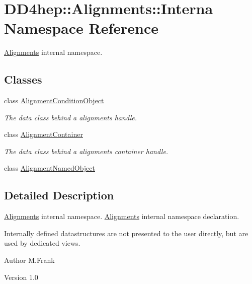 \hypertarget{namespace_d_d4hep_1_1_alignments_1_1_interna}{
\section{DD4hep::Alignments::Interna Namespace Reference}
\label{namespace_d_d4hep_1_1_alignments_1_1_interna}
}


\hyperlink{namespace_d_d4hep_1_1_alignments}{Alignments} internal namespace.  
\subsection*{Classes}
\begin{DoxyCompactItemize}
\item 
class \hyperlink{class_d_d4hep_1_1_alignments_1_1_interna_1_1_alignment_condition_object}{AlignmentConditionObject}
\begin{DoxyCompactList}\small\item\em The data class behind a alignments handle. \item\end{DoxyCompactList}\item 
class \hyperlink{class_d_d4hep_1_1_alignments_1_1_interna_1_1_alignment_container}{AlignmentContainer}
\begin{DoxyCompactList}\small\item\em The data class behind a alignments container handle. \item\end{DoxyCompactList}\item 
class \hyperlink{class_d_d4hep_1_1_alignments_1_1_interna_1_1_alignment_named_object}{AlignmentNamedObject}
\end{DoxyCompactItemize}


\subsection{Detailed Description}
\hyperlink{namespace_d_d4hep_1_1_alignments}{Alignments} internal namespace. \hyperlink{namespace_d_d4hep_1_1_alignments}{Alignments} internal namespace declaration.

Internally defined datastructures are not presented to the user directly, but are used by dedicated views.

\begin{DoxyAuthor}{Author}
M.Frank 
\end{DoxyAuthor}
\begin{DoxyVersion}{Version}
1.0 
\end{DoxyVersion}
